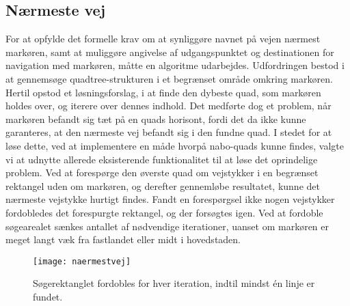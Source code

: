 \subsection{Nærmeste vej}
For at opfylde det formelle krav om at synliggøre navnet på vejen nærmest markøren, samt at muliggøre angivelse af udgangspunktet             og destinationen for navigation med markøren, måtte en algoritme udarbejdes. Udfordringen bestod i at gennemsøge quadtree-strukturen i et begrænset område omkring markøren. Hertil opstod et løsningsforslag, i at finde den dybeste quad, som markøren holdes over, og iterere over dennes indhold. Det medførte dog et problem, når markøren befandt sig tæt på en quads horisont, fordi det da ikke kunne garanteres, at den nærmeste vej befandt sig i den fundne quad. I stedet for at løse dette, ved at implementere en måde hvorpå nabo-quads kunne findes, valgte vi at udnytte allerede eksisterende funktionalitet til at løse det oprindelige problem. Ved at forespørge den øverste quad om vejstykker i en begrænset rektangel uden om markøren, og derefter gennemløbe resultatet, kunne det nærmeste vejstykke hurtigt findes. Fandt en forespørgsel ikke nogen vejstykker fordobledes det forespurgte rektangel, og der forsøgtes igen. Ved at fordoble søgearealet sænkes antallet af nødvendige iterationer, uanset om markøren er meget langt væk fra fastlandet eller midt i hovedstaden.
\begin{figure}[ht]
	\centering
	\texttt{[image: naermestvej]}
	\captionsetup{width=0.8\textwidth}
	\caption{Søgerektanglet fordobles for hver iteration, indtil mindst én linje er fundet.}
	\label{fig:naermestvej}
\end{figure}